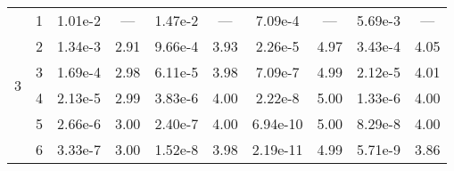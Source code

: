 \begin{table}
{\begin{tabular}{l c c c c c c c c c}
\midrule
\multirow{6}{*}{3}
 & 1 & 1.01e-2 & --- & 1.47e-2 & --- & 7.09e-4 & --- & 5.69e-3 & --- \\ 
 & 2 & 1.34e-3 & 2.91 & 9.66e-4 & 3.93 & 2.26e-5 & 4.97 & 3.43e-4 & 4.05 \\ 
 & 3 & 1.69e-4 & 2.98 & 6.11e-5 & 3.98 & 7.09e-7 & 4.99 & 2.12e-5 & 4.01 \\ 
 & 4 & 2.13e-5 & 2.99 & 3.83e-6 & 4.00 & 2.22e-8 & 5.00 & 1.33e-6 & 4.00 \\ 
 & 5 & 2.66e-6 & 3.00 & 2.40e-7 & 4.00 & 6.94e-10 & 5.00 & 8.29e-8 & 4.00 \\ 
 & 6 & 3.33e-7 & 3.00 & 1.52e-8 & 3.98 & 2.19e-11 & 4.99 & 5.71e-9 & 3.86 \\ 

        \bottomrule
    \end{tabular}}
\end{table}
